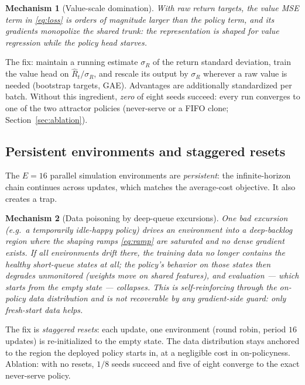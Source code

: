 \documentclass[11pt,a4paper]{article}
\newtheorem{mechanism}{Mechanism}
\begin{document}
\begin{mechanism}[Value-scale domination]
With raw return targets, the value MSE term in \eqref{eq:loss} is orders
of magnitude larger than the policy term, and its gradients monopolize
the shared trunk: the representation is shaped for value regression
while the policy head starves.
\end{mechanism}

The fix: maintain a running estimate $\sigma_R$ of the return standard
deviation, train the value head on $\hat R_t / \sigma_R$, and rescale
its output by $\sigma_R$ wherever a raw value is needed (bootstrap
targets, GAE).  Advantages are additionally standardized per batch.
Without this ingredient, \emph{zero} of eight seeds succeed: every run
converges to one of the two attractor policies (never-serve or a FIFO
clone; Section~\ref{sec:ablation}).

\subsection{Persistent environments and staggered resets}
\label{sec:resets}

The $E = 16$ parallel simulation environments are \emph{persistent}:
the infinite-horizon chain continues across updates, which matches the
average-cost objective.  It also creates a trap.

\begin{mechanism}[Data poisoning by deep-queue excursions]
\label{mech:poison}
One bad excursion (e.g.\ a temporarily idle-happy policy) drives an
environment into a deep-backlog region where the shaping ramps
\eqref{eq:ramp} are saturated and no dense gradient exists.  If all
environments drift there, the training data no longer contains the
healthy short-queue states at all; the policy's behavior on those
states then degrades unmonitored (weights move on shared features), and
evaluation --- which starts from the empty state --- collapses.  This is
self-reinforcing through the on-policy data distribution and is not
recoverable by any gradient-side guard: only fresh-start data helps.
\end{mechanism}

The fix is \emph{staggered resets}: each update, one environment (round
robin, period $16$ updates) is re-initialized to the empty state.  The
data distribution stays anchored to the region the deployed policy
starts in, at a negligible cost in on-policyness.  Ablation: with no
resets, $1/8$ seeds succeed and five of eight converge to the exact
never-serve policy.
\end{document}
